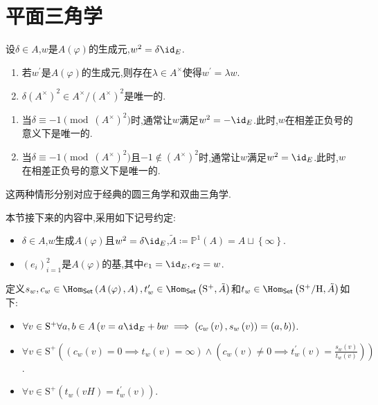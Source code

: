 \section{平面三角学}

\begin{proposition}{}{}
	设$\delta\in A$,$w$是$A\left(\varphi\right)$的生成元,$w^{2}=\delta\id_{E}$.
	\begin{enumerate}
		\item 若$w^{\prime}$是$A\left(\varphi\right)$的生成元,则存在$\lambda\in A^{\times}$使得$w^{\prime}=\lambda w$.
		\item $\delta\left(A^{\times}\right)^{2}\in A^{\times}/\left(A^{\times}\right)^{2}$是唯一的.
	\end{enumerate}
\end{proposition}

\begin{remark}{}{}
	\begin{enumerate}
		\item 当$\delta\equiv -1\pmod{\left(A^{\times}\right)^{2}}$时,通常让$w$满足$w^{2}=-\id_{E}$.此时,$w$在相差正负号的意义下是唯一的.
		\item 当$\delta\equiv -1\pmod{\left(A^{\times}\right)^{2}}$且$-1\notin\left(A^{\times}\right)^{2}$时,通常让$w$满足$w^{2}=\id_{E}$.此时,$w$在相差正负号的意义下是唯一的.
	\end{enumerate}
	这两种情形分别对应于经典的圆三角学和双曲三角学.
\end{remark}

本节接下来的内容中,采用如下记号约定:
\begin{itemize}
	\item $\delta\in A$,$w$生成$A\left(\varphi\right)$且$w^{2}=\delta\id_{E}$,$\tilde{A}\coloneq\mathbb{P}^{1}\left(A\right)=A\sqcup\left\{\infty\right\}$.
	\item $\left(e_{i}\right)_{i=1}^{2}$是$A\left(\varphi\right)$的基,其中$e_{1}=\id_{E},e_{2}=w$.
\end{itemize}

\begin{definition}{}{}
	定义$s_{w},c_{w}\in\Hom_{\mathsf{Set}}\left(A\left(\varphi\right),A\right),t_{w}^{\prime}\in\Hom_{\mathsf{Set}}\left(\mathrm{S}^{+},\tilde{A}\right)$和$t_{w}\in\Hom_{\mathsf{Set}}\left(\mathrm{S}^{+}/\mathrm{H},\tilde{A}\right)$如下:
	\begin{itemize}
		\item $\forall v\in\mathrm{S}^{+}\forall a,b\in A\left(v=a\id_{E}+bw\implies\left(c_{w}\left(v\right),s_{w}\left(v\right)\right)=\left(a,b\right)\right)$.
		\item $\forall v\in\mathrm{S}^{+}\left(\left(c_{w}\left(v\right)=0\implies t_{w}\left(v\right)=\infty\right)\wedge\left(c_{w}\left(v\right)\neq 0\implies t_{w}^{\prime}\left(v\right)=\frac{s_{w}\left(v\right)}{t_{w}\left(v\right)}\right)\right)$.
		\item $\forall v\in\mathrm{S}^{+}\left(t_{w}\left(vH\right)=t_{w}^{\prime}\left(v\right)\right)$.
	\end{itemize}
\end{definition}

